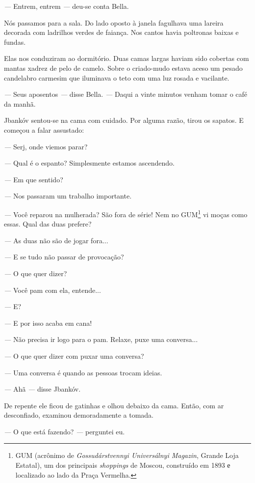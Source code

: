 \emph{---} Entrem, entrem \emph{---} deu-se conta Bella.

Nós passamos para a sala. Do lado oposto à janela fagulhava uma lareira
decorada com ladrilhos verdes de faiança. Nos cantos havia poltronas
baixas e fundas.

Elas nos conduziram ao dormitório. Duas camas largas haviam sido
cobertas com mantas xadrez de pelo de camelo. Sobre o criado-mudo estava
aceso um pesado candelabro carmesim que iluminava o teto com uma luz
rosada e vacilante.

\emph{---} Seus aposentos \emph{---} disse Bella. \emph{---} Daqui a
vinte minutos venham tomar o café da manhã.

Jbankóv sentou-se na cama com cuidado. Por alguma razão, tirou os
sapatos. E começou a falar assustado:

\emph{---} Serj, onde viemos parar?

\emph{---} Qual é o espanto? Simplesmente estamos ascendendo.

\emph{---} Em que sentido?

\emph{---} Nos passaram um trabalho importante.

\emph{---} Você reparou na mulherada? São fora de série! Nem no
GUM\footnote{GUM (acrônimo de \emph{Gossudárstvennyi Universálnyi
  Magazin}, Grande Loja Estatal), um dos principais \emph{shoppings} de
  Moscou, construído em 1893 е localizado ao lado da Praça Vermelha.} vi
moças como essas. Qual das duas prefere?

\emph{---} As duas não são de jogar fora...

\emph{---} E se tudo não passar de provocação?

\emph{---} O que quer dizer?

\emph{---} Você pam com ela, entende...

\emph{---} E?

\emph{---} E por isso acaba em cana!

\emph{---} Não precisa ir logo para o pam. Relaxe, puxe uma conversa...

\emph{---} O que quer dizer com puxar uma conversa?

\emph{---} Uma conversa é quando as pessoas trocam ideias.

\emph{---} Ahã \emph{---} disse Jbankóv.

De repente ele ficou de gatinhas e olhou debaixo da cama. Então, com ar
desconfiado, examinou demoradamente a tomada.

\emph{---} O que está fazendo? \emph{---} perguntei eu.

